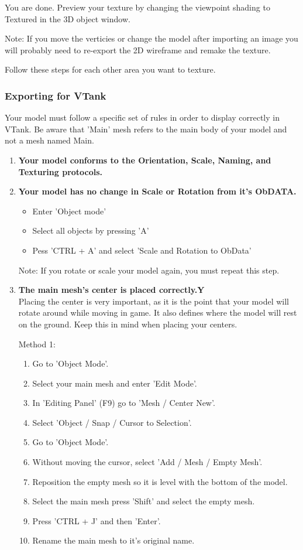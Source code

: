 You are done. Preview your texture by changing the viewpoint shading to Textured in the 3D object window. 

Note: If you move the verticies or change the model after importing an image you will probably need to re-export the 2D wireframe and remake the texture.

Follow these steps for each other area you want to texture.

\subsubsection {Exporting for VTank}
Your model must follow a specific set of rules in order to display correctly in VTank. Be aware that 'Main' mesh refers to the main body of your model and not a mesh named Main.

\begin {enumerate}
\item {\bf Your model conforms to the Orientation, Scale, Naming, and Texturing protocols. }
\item {\bf Your model has no change in Scale or Rotation from it's ObDATA. }\\
\begin{itemize}
	\item Enter 'Object mode'
	\item Select all objects by pressing 'A'
	\item Pess 'CTRL + A' and select 'Scale and Rotation to ObData'
\end{itemize}

Note: If you rotate or scale your model again, you must repeat this step. 

\item {\bf The main mesh's center is placed correctly.Y}\\
Placing the center is very important, as it is the point that your model will rotate around while moving in game. It also defines where the model will rest on the ground. Keep this in mind when placing your centers. 

Method 1: 
\begin{enumerate}
	\item Go to 'Object Mode'.
	\item Select your main mesh and enter 'Edit Mode'.
	\item In 'Editing Panel' (F9) go to 'Mesh / Center New'.
	\item Select 'Object / Snap / Cursor to Selection'.
	\item Go to 'Object Mode'.
	\item Without moving the cursor, select 'Add / Mesh / Empty Mesh'.
	\item Reposition the empty mesh so it is level with the bottom of the model.
	\item Select the main mesh press 'Shift' and select the empty mesh.
	\item Press 'CTRL + J' and then 'Enter'.
	\item Rename the main mesh to it's original name.
\end{enumerate}


\end{enumerate}
